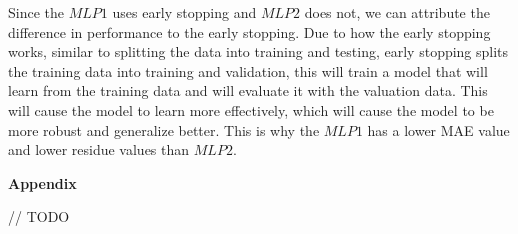 \documentclass[12pt]{article}
\begin{document}
\begin{enumerate}[leftmargin=\labelsep,resume]
          Since the $MLP1$ uses early stopping and $MLP2$ does not, we can
          attribute the difference in performance to the early stopping.
          Due to how the early stopping works, similar to splitting the data
          into training and testing, early stopping splits the training data
          into training and validation, this will train a model that will
          learn from the training data and will evaluate it with the valuation data.
          This will cause the model to learn more effectively, which will cause
          the model to be more robust and generalize better.
          This is why the $MLP1$ has a lower MAE value and lower residue values than $MLP2$.

\end{enumerate}

\pagebreak

\center\large{\textbf{Appendix}\vskip 0.3cm}







// TODO
\end{document}
